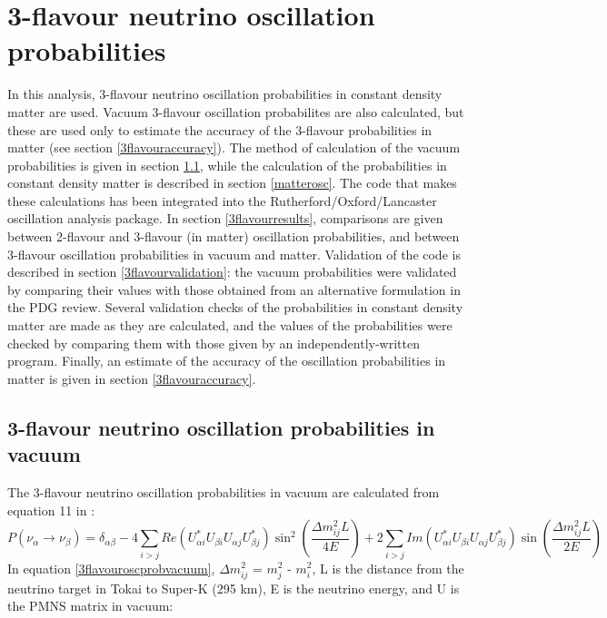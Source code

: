 
\section{3-flavour neutrino oscillation probabilities}
\label{sec:nuosc3f}

In this analysis, 3-flavour neutrino oscillation probabilities in constant density matter are used. Vacuum 3-flavour oscillation 
probabilites are also calculated, but these are used only to estimate the accuracy of the 3-flavour probabilities in matter (see 
section \ref{3flavouraccuracy}). 
The method of calculation of the vacuum probabilities is given in section \ref{vacuumosc}, while the calculation 
of the probabilities in constant density matter is described in section \ref{matterosc}. The code that makes these calculations 
has been integrated into the Rutherford/Oxford/Lancaster oscillation analysis package. In section \ref{3flavourresults}, 
comparisons are given between 2-flavour and 3-flavour (in matter) oscillation probabilities, and between 3-flavour oscillation probabilities 
in vacuum and matter. Validation of the code is described in section \ref{3flavourvalidation}: the vacuum probabilities were validated 
by comparing their values with those obtained from an alternative formulation in the PDG review. Several validation checks of 
the probabilities in constant density matter are made as they are calculated, and the values of the probabilities were checked 
by comparing them with those given by an independently-written program. Finally, an estimate of the accuracy of the oscillation 
probabilities in matter is given in section \ref{3flavouraccuracy}.
   
\subsection{3-flavour neutrino oscillation probabilities in vacuum}
\label{vacuumosc}

The 3-flavour neutrino oscillation probabilities in vacuum are calculated from equation 11 in \cite{kayser2005}:
\begin{equation}
P(\nu_{\alpha} \rightarrow \nu_{\beta}) = \delta_{\alpha \beta} - 4 \sum_{i>j} Re(U_{\alpha i}^{*} U_{\beta i} U_{\alpha j} U_{\beta j}^{*})
\sin^{2} \left( \frac{\Delta m_{ij}^{2} L}{4E} \right) + 2 \sum_{i>j} Im(U_{\alpha i}^{*} U_{\beta i} U_{\alpha j} U_{\beta j}^{*})
\sin \left(\frac{\Delta m_{ij}^{2} L}{2E} \right)
\label{3flavouroscprobvacuum}
\end{equation}
In equation \ref{3flavouroscprobvacuum}, $\Delta m_{ij}^{2}$ = $m_{j}^{2}$ - $m_{i}^{2}$, L is the distance from the neutrino target 
in Tokai to Super-K (295 km), E is the neutrino energy, and U is the PMNS matrix in vacuum:


